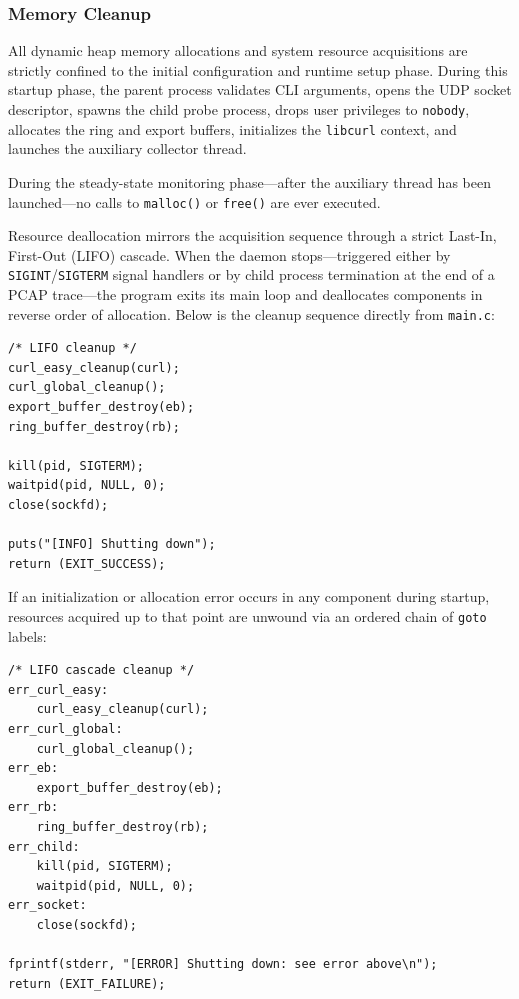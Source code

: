 \documentclass[11pt,a4paper]{article}
\newenvironment{codebox}[1][]{%
    \begin{tcolorbox}[
        colback=codebg,
        colframe=codeframe,
        boxrule=0.6pt,
        arc=1.5mm,
        left=3mm,
        right=3mm,
        top=2mm,
        bottom=2mm,
        fonttitle=\sffamily\bfseries\footnotesize,
        coltitle=chibadark,
        colbacktitle=codeframe!50!white,
        #1
    ]
}{%
    \end{tcolorbox}
}
\begin{document}
\subsubsection{Memory Cleanup}
All dynamic heap memory allocations and system resource acquisitions are strictly confined to the initial configuration and runtime setup phase. During this startup phase, the parent process validates CLI arguments, opens the UDP socket descriptor, spawns the child probe process, drops user privileges to \texttt{nobody}, allocates the ring and export buffers, initializes the \texttt{libcurl} context, and launches the auxiliary collector thread.

During the steady-state monitoring phase---after the auxiliary thread has been launched---no calls to \texttt{malloc()} or \texttt{free()} are ever executed.

Resource deallocation mirrors the acquisition sequence through a strict Last-In, First-Out (LIFO) cascade. When the daemon stops---triggered either by \texttt{SIGINT}/\texttt{SIGTERM} signal handlers or by child process termination at the end of a PCAP trace---the program exits its main loop and deallocates components in reverse order of allocation. Below is the cleanup sequence directly from \texttt{main.c}:

\begin{codebox}[title={Graceful LIFO Teardown (\texttt{src/main.c})}]
\footnotesize
\begin{verbatim}
/* LIFO cleanup */
curl_easy_cleanup(curl);
curl_global_cleanup();
export_buffer_destroy(eb);
ring_buffer_destroy(rb);

kill(pid, SIGTERM);
waitpid(pid, NULL, 0);
close(sockfd);

puts("[INFO] Shutting down");
return (EXIT_SUCCESS);
\end{verbatim}
\end{codebox}

If an initialization or allocation error occurs in any component during startup, resources acquired up to that point are unwound via an ordered chain of \texttt{goto} labels:

\begin{codebox}[title={Cascading Error Unwinding via \texttt{goto} (\texttt{src/main.c})}]
\footnotesize
\begin{verbatim}
/* LIFO cascade cleanup */
err_curl_easy:
    curl_easy_cleanup(curl);
err_curl_global:
    curl_global_cleanup();
err_eb:
    export_buffer_destroy(eb);
err_rb:
    ring_buffer_destroy(rb);
err_child:
    kill(pid, SIGTERM);
    waitpid(pid, NULL, 0);
err_socket:
    close(sockfd);

fprintf(stderr, "[ERROR] Shutting down: see error above\n");
return (EXIT_FAILURE);
\end{verbatim}
\end{codebox}
\end{document}

